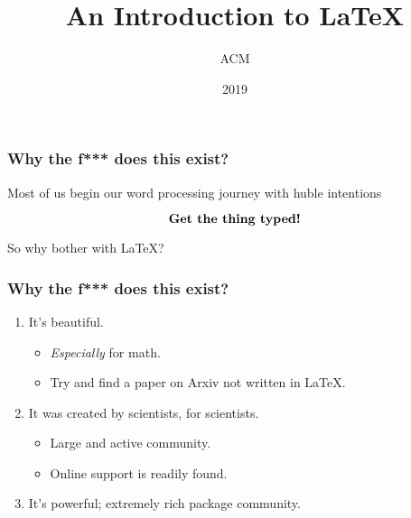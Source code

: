 \documentclass{beamer}
\title{An Introduction to \LaTeX}
\author{ACM}
\institute{New York University}
\date{2019}
\begin{document}
 
\frame{\titlepage}
 

\begin{frame}
\frametitle{Why the f*** does this exist?}
Most of us begin our word processing journey with huble intentions

\[
\text{\textbf{Get the thing typed!}}
\]

So why bother with \LaTeX?

\end{frame}


\begin{frame}
\frametitle{Why the f*** does this exist?}

\begin{enumerate}

    \item It's beautiful.

        \begin{itemize}
            \item \textit{Especially} for math.
            \item Try and find a paper on Arxiv not written in \LaTeX.
        \end{itemize}

    \item It was created by scientists, for scientists.

        \begin{itemize}
            \item Large and active community.
            \item Online support is readily found.
        \end{itemize}

    \item It's powerful; extremely rich package community.

\end{enumerate}

\end{frame}
\end{document}
